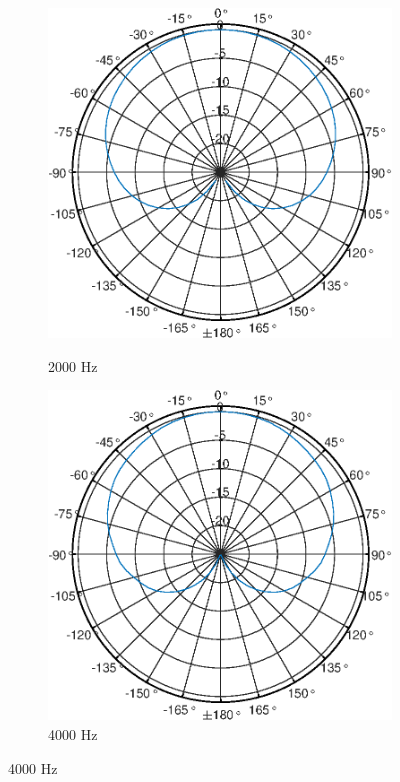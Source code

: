 \begin{figure}[bth]
    \begin{subfigure}{.25\textwidth}
        \centering
        \caption{2000 Hz}
        \includegraphics[width=\linewidth]{Figures/KM184_2000Hz}
        \label{fig:Polar_2000}
    \end{subfigure}%
    \begin{subfigure}{.25\textwidth}
        \centering
        \caption{4000 Hz}
        \includegraphics[width=\linewidth]{Figures/KM184_4000Hz}

\end{subfigure}
\end{figure}
